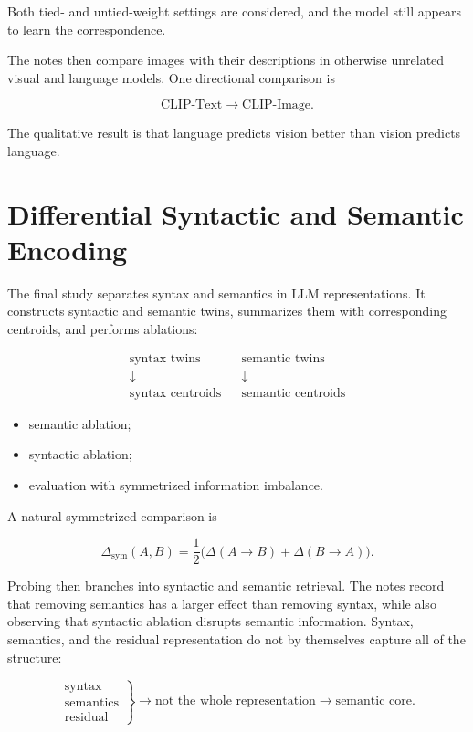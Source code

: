 \documentclass[11pt,a4paper]{article}
\begin{document}
Both tied- and untied-weight settings are considered, and the model still
appears to learn the correspondence.

The notes then compare images with their descriptions in otherwise unrelated
visual and language models. One directional comparison is

\[
  \text{CLIP-Text} \longrightarrow \text{CLIP-Image}.
\]

The qualitative result is that language predicts vision better than vision
predicts language.

\section{Differential Syntactic and Semantic Encoding}

The final study separates syntax and semantics in LLM representations. It
constructs syntactic and semantic twins, summarizes them with corresponding
centroids, and performs ablations:

\[
\begin{array}{ccc}
  \text{syntax twins} && \text{semantic twins} \\
  \downarrow && \downarrow \\
  \text{syntax centroids} && \text{semantic centroids}
\end{array}
\]

\begin{itemize}
  \item semantic ablation;
  \item syntactic ablation;
  \item evaluation with symmetrized information imbalance.
\end{itemize}

A natural symmetrized comparison is

\[
  \Delta_{\mathrm{sym}}(A,B)
  = \frac{1}{2}
    \bigl(\Delta(A \to B) + \Delta(B \to A)\bigr).
\]

Probing then branches into syntactic and semantic retrieval. The notes record
that removing semantics has a larger effect than removing syntax, while also
observing that syntactic ablation disrupts semantic information. Syntax,
semantics, and the residual representation do not by themselves capture all of
the structure:

\[
  \left.
  \begin{array}{l}
    \text{syntax} \\
    \text{semantics} \\
    \text{residual}
  \end{array}
  \right\}
  \longrightarrow
  \text{not the whole representation}
  \longrightarrow
  \text{semantic core}.
\]
\end{document}
